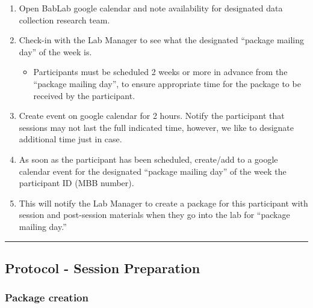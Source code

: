 \documentclass[]{book}
\providecommand{\tightlist}{%
  \setlength{\itemsep}{0pt}\setlength{\parskip}{0pt}}
\begin{document}
\begin{enumerate}
\def\labelenumi{\arabic{enumi}.}
\tightlist
\item
  Open BabLab google calendar and note availability for designated data collection research team.
\item
  Check-in with the Lab Manager to see what the designated ``package mailing day'' of the week is.

  \begin{itemize}
  \tightlist
  \item
    Participants must be scheduled 2 weeks or more in advance from the ``package mailing day'', to ensure appropriate time for the package to be received by the participant.
  \end{itemize}
\item
  Create event on google calendar for 2 hours. Notify the participant that sessions may not last the full indicated time, however, we like to designate additional time just in case.
\item
  As soon as the participant has been scheduled, create/add to a google calendar event for the designated ``package mailing day'' of the week the participant ID (MBB number).
\item
  This will notify the Lab Manager to create a package for this participant with session and post-session materials when they go into the lab for ``package mailing day.''
\end{enumerate}

\begin{center}\rule{0.5\linewidth}{0.5pt}\end{center}

\hypertarget{protocol---session-preparation-1}{%
\subsection{Protocol - Session Preparation}\label{protocol---session-preparation-1}}

\hypertarget{package-creation-1}{%
\subsubsection{Package creation}\label{package-creation-1}}
\end{document}
